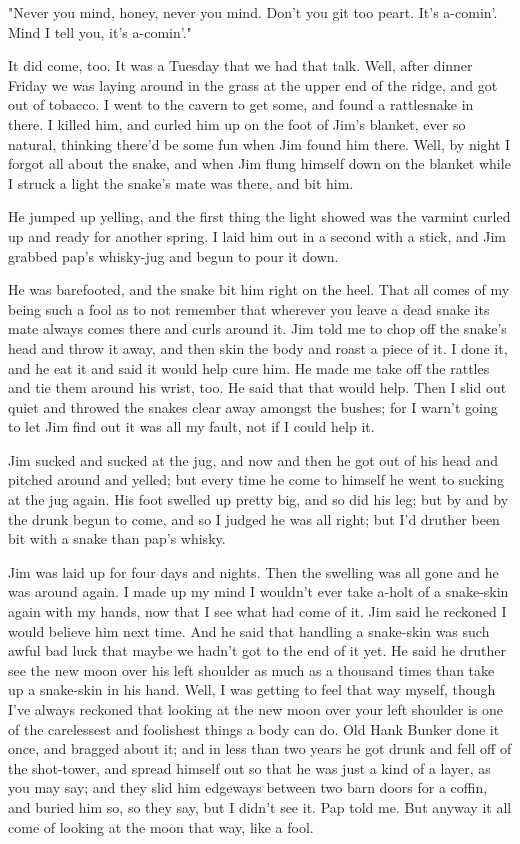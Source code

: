 "Never you mind, honey, never you mind.  Don't you git too peart.  It's
a-comin'.  Mind I tell you, it's a-comin'."

It did come, too.  It was a Tuesday that we had that talk.  Well, after
dinner Friday we was laying around in the grass at the upper end of the
ridge, and got out of tobacco.  I went to the cavern to get some, and
found a rattlesnake in there.  I killed him, and curled him up on the
foot of Jim's blanket, ever so natural, thinking there'd be some fun when
Jim found him there.  Well, by night I forgot all about the snake, and
when Jim flung himself down on the blanket while I struck a light the
snake's mate was there, and bit him.

He jumped up yelling, and the first thing the light showed was the
varmint curled up and ready for another spring.  I laid him out in a
second with a stick, and Jim grabbed pap's whisky-jug and begun to pour
it down.

He was barefooted, and the snake bit him right on the heel.  That all
comes of my being such a fool as to not remember that wherever you leave
a dead snake its mate always comes there and curls around it.  Jim told
me to chop off the snake's head and throw it away, and then skin the body
and roast a piece of it.  I done it, and he eat it and said it would help
cure him. He made me take off the rattles and tie them around his wrist,
too.  He said that that would help.  Then I slid out quiet and throwed
the snakes clear away amongst the bushes; for I warn't going to let Jim
find out it was all my fault, not if I could help it.

Jim sucked and sucked at the jug, and now and then he got out of his head
and pitched around and yelled; but every time he come to himself he went
to sucking at the jug again.  His foot swelled up pretty big, and so did
his leg; but by and by the drunk begun to come, and so I judged he was
all right; but I'd druther been bit with a snake than pap's whisky.

Jim was laid up for four days and nights.  Then the swelling was all gone
and he was around again.  I made up my mind I wouldn't ever take a-holt
of a snake-skin again with my hands, now that I see what had come of it.
Jim said he reckoned I would believe him next time.  And he said that
handling a snake-skin was such awful bad luck that maybe we hadn't got to
the end of it yet.  He said he druther see the new moon over his left
shoulder as much as a thousand times than take up a snake-skin in his
hand.  Well, I was getting to feel that way myself, though I've always
reckoned that looking at the new moon over your left shoulder is one of
the carelessest and foolishest things a body can do.  Old Hank Bunker
done it once, and bragged about it; and in less than two years he got
drunk and fell off of the shot-tower, and spread himself out so that he
was just a kind of a layer, as you may say; and they slid him edgeways
between two barn doors for a coffin, and buried him so, so they say, but
I didn't see it.  Pap told me.  But anyway it all come of looking at the
moon that way, like a fool.

